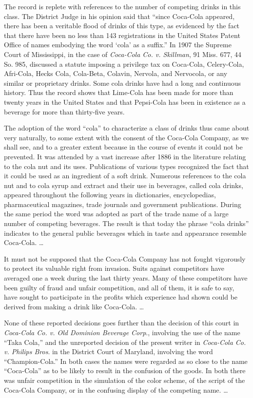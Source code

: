 The record is replete with references to the number of competing drinks in this
class. The District Judge in his opinion said that ``since Coca-Cola appeared,
there has been a veritable flood of drinks of this type, as evidenced by the
fact that there have been no less than 143 registrations in the United States
Patent Office of names embodying the word `cola' as a suffix.'' In 1907 the
Supreme Court of Mississippi, in the case of \textit{Coca-Cola Co. v.
Skillman}, 91 Miss. 677, 44 So. 985, discussed a statute imposing a privilege
tax on Coca-Cola, Celery-Cola, Afri-Cola, Hecks Cola, Cola-Beta, Colavin,
Nervola, and Nervocola, or any similar or proprietary drinks. Some cola drinks
have had a long and continuous history. Thus the record shows that Lime-Cola
has been made for more than twenty years in the United States and that
Pepsi-Cola has been in existence as a beverage for more than thirty-five years.

The adoption of the word ``cola'' to characterize a class of drinks
thus came about very naturally, to some extent with the consent of the
Coca-Cola Company, as we shall see, and to a greater extent because in the
course of events it could not be prevented. It was attended by a vast increase
after 1886 in the literature relating to the cola nut and its uses.
Publications of various types recognized the fact that it could be used as an
ingredient of a soft drink. Numerous references to the cola nut and to cola
syrup and extract and their use in beverages, called cola drinks, appeared
throughout the following years in dictionaries, encyclopedias, pharmaceutical
magazines, trade journals and government publications. During the same period
the word was adopted as part of the trade name of a large number of competing
beverages. The result is that today the phrase ``cola drinks'' indicates to the
general public beverages which in taste and appearance resemble Coca-Cola.
{\dots}

It must not be supposed that the Coca-Cola Company has not fought vigorously to
protect its valuable right from invasion. Suits against competitors have
averaged one a week during the last thirty years. Many of these competitors
have been guilty of fraud and unfair competition, and all of them, it is safe
to say, have sought to participate in the profits which experience had shown
could be derived from making a drink like Coca-Cola. {\dots}

None of these reported decisions goes further than the decision of this court in
\textit{Coca-Cola Co. v. Old Dominion Beverage Corp}.,  involving the use of
the name ``Taka Cola,'' and the unreported decision of the present writer in
\textit{Coca-Cola Co. v. Philips Bros}. in the District Court of Maryland,
involving the word ``Champion-Cola.'' In both cases the names were regarded as
so close to the name ``Coca-Cola'' as to be likely to result in the confusion
of the goods. In both there was unfair competition in the simulation of the
color scheme, of the script of the Coca-Cola Company, or in the confusing
display of the competing name. {\dots}

